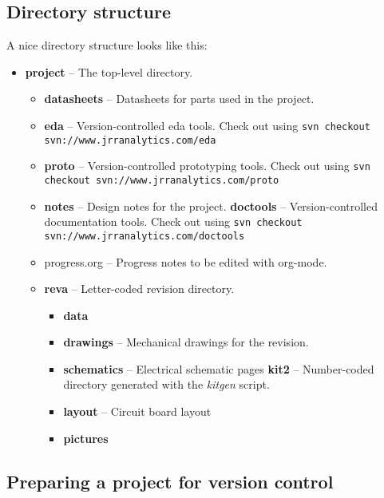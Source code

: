 \subsection{Directory structure}
\label{project_structure_subsection}
A nice directory structure looks like this:
\begin{itemize}
    \item \textbf{project} -- The top-level directory.
        \begin{itemize}
            \item \textbf{datasheets} -- Datasheets for parts used in the project.
            \item \textbf{eda} -- Version-controlled eda tools.
                \subitem Check out using \texttt{svn checkout svn://www.jrranalytics.com/eda}
            \item \textbf{proto} -- Version-controlled prototyping tools.
                \subitem Check out using \texttt{svn checkout svn://www.jrranalytics.com/proto}
            \item \textbf{notes} -- Design notes for the project.
                \subitem \textbf{doctools} -- Version-controlled documentation tools.
                    \subsubitem Check out using \texttt{svn checkout svn://www.jrranalytics.com/doctools}
            \item progress.org -- Progress notes to be edited with org-mode.
            \item \textbf{reva} -- Letter-coded revision directory.
                \begin{itemize}
                    \item \textbf{data}
                    \item \textbf{drawings} -- Mechanical drawings for the revision.
                    \item \textbf{schematics} -- Electrical schematic pages
                        \subitem \textbf{kit2} -- Number-coded directory generated with the \textit{kitgen} script.
                    \item \textbf{layout} -- Circuit board layout
                    \item \textbf{pictures}
                \end{itemize}
        \end{itemize}
\end{itemize}

\subsection{Preparing a project for version control}

